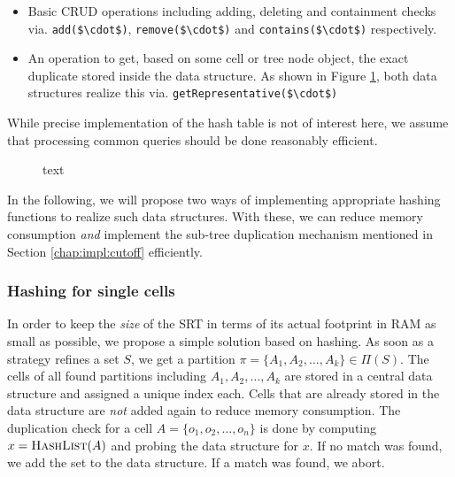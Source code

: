 		\begin{itemize}
			\item Basic \ac{CRUD} operations including adding, deleting and containment checks via. \lstinline[mathescape]|add($\cdot$)|, \lstinline[mathescape]|remove($\cdot$)| and \lstinline[mathescape]|contains($\cdot$)| respectively.
			\item An operation to get, based on some cell or tree node object, the exact duplicate stored inside the data structure. As shown in Figure \ref{fig:impl:hashing:datastruct}, both data structures realize this via. \lstinline[mathescape]|getRepresentative($\cdot$)|
		\end{itemize}

		While precise implementation of the hash table is not of interest here, we assume that processing common queries should be done reasonably efficient.

		\begin{figure}[ht!]
			\centering
			
			\caption{text}
			\label{fig:impl:hashing:datastruct}
		\end{figure}

		In the following, we will propose two ways of implementing appropriate hashing functions to realize such data structures.
		With these, we can reduce memory consumption \textit{and} implement the sub-tree duplication mechanism mentioned in Section \ref{chap:impl:cutoff} efficiently.

		\clearpage

		\subsubsection{Hashing for single cells}

		In order to keep the \textit{size} of the \ac{SRT} in terms of its actual footprint in RAM as small as possible, we propose a simple solution based on hashing.
		As soon as a strategy refines a set $S$, we get a partition $\pi = \{ A_1, A_2, \ldots, A_k \}\in \Pi(S)$.
		The cells of all found partitions including $A_1, A_2, \ldots, A_k$ are stored in a central data structure and assigned a unique index each.
		Cells that are already stored in the data structure are \textit{not} added again to reduce memory consumption.
		The duplication check for a cell $A = \{ o_1, o_2, \ldots, o_n \}$ is done by computing $x = \Call{HashList}{A}$ and probing the data structure for $x$.
		If no match was found, we add the set to the data structure.
		If a match was found, we abort.


